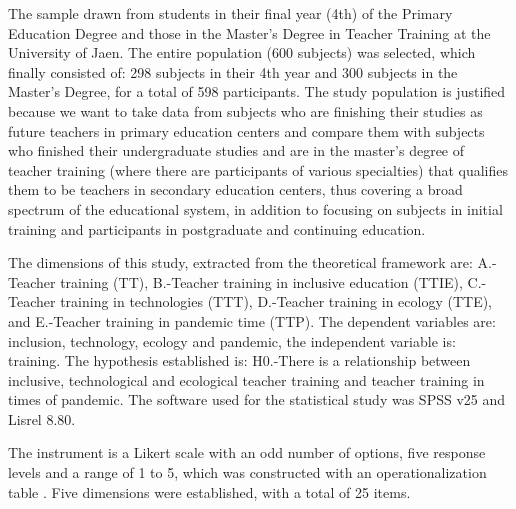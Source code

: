 \documentclass[english]{textolivre}
\begin{document}
The sample drawn from students in their final year (4th) of the Primary Education Degree and those in the Master's Degree in Teacher Training at the University of Jaen. The entire population (600 subjects) was selected, which finally consisted of: 298 subjects in their 4th year and 300 subjects in the Master's Degree, for a total of 598 participants. The study population is justified because we want to take data from subjects who are finishing their studies as future teachers in primary education centers and compare them with subjects who finished their undergraduate studies and are in the master's degree of teacher training (where there are participants of various specialties) that qualifies them to be teachers in secondary education centers, thus covering a broad spectrum of the educational system, in addition to focusing on subjects in initial training and participants in postgraduate and continuing education.

The dimensions of this study, extracted from the theoretical framework are: A.-Teacher training (TT), B.-Teacher training in inclusive education (TTIE), C.-Teacher training in technologies (TTT), D.-Teacher training in ecology (TTE), and E.-Teacher training in pandemic time (TTP). The dependent variables are: inclusion, technology, ecology and pandemic, the independent variable is: training. The hypothesis established is: H0.-There is a relationship between inclusive, technological and ecological teacher training and teacher training in times of pandemic. The software used for the statistical study was SPSS v25 and Lisrel 8.80.

The instrument is a Likert scale with an odd number of options, five response levels and a range of 1 to 5, which was constructed with an operationalization table . Five dimensions were established, with a total of 25 items.
\end{document}

